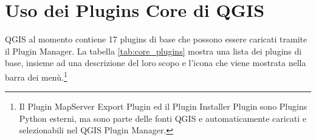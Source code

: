 
\section{Uso dei Plugins Core di QGIS}\label{sec:core_plugins}


QGIS al momento contiene 17 plugins di base che possono essere caricati tramite
il Plugin Manager.
La tabella \ref{tab:core_plugins} mostra una lista dei plugins di base, insieme
ad una descrizione del loro scopo e l'icona che viene mostrata nella barra dei
menù.\footnote{Il Plugin MapServer
Export Plugin ed il Plugin Installer Plugin sono Plugins Python esterni,
ma sono parte delle fonti QGIS e automaticamente caricati e selezionabili nel QGIS Plugin Manager.}

